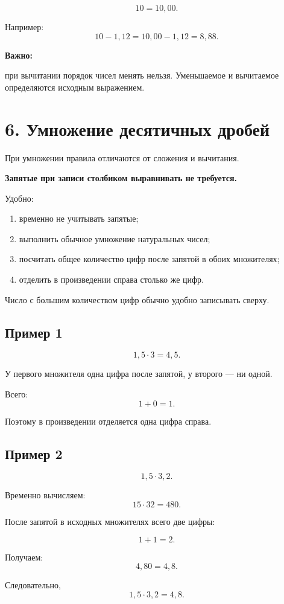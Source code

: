 \documentclass[a4paper,12pt]{article}
\newcommand{\sectiontitle}[1]{%
  \section*{\color{darkaccent}#1}%
}
\newcommand{\important}[1]{%
  \textbf{\color{darkaccent}#1}%
}
\begin{document}
\[
10=10{,}00.
\]

Например:
\[
10-1{,}12
=
10{,}00-1{,}12
=
8{,}88.
\]

\important{Важно:}
при вычитании порядок чисел менять нельзя.
Уменьшаемое и вычитаемое определяются исходным выражением.


\sectiontitle{6. Умножение десятичных дробей}

При умножении правила отличаются от сложения и вычитания.

\important{Запятые при записи столбиком выравнивать не требуется.}

Удобно:

\begin{enumerate}
  \item временно не учитывать запятые;
  \item выполнить обычное умножение натуральных чисел;
  \item посчитать общее количество цифр после запятой
        в обоих множителях;
  \item отделить в произведении справа столько же цифр.
\end{enumerate}

Число с большим количеством цифр обычно удобно записывать сверху.

\subsection*{\color{accent}Пример 1}

\[
1{,}5\cdot3=4{,}5.
\]

У первого множителя одна цифра после запятой,
у второго --- ни одной.

Всего:
\[
1+0=1.
\]

Поэтому в произведении отделяется одна цифра справа.

\subsection*{\color{accent}Пример 2}

\[
1{,}5\cdot3{,}2.
\]

Временно вычисляем:
\[
15\cdot32=480.
\]

После запятой в исходных множителях всего две цифры:

\[
1+1=2.
\]

Получаем:
\[
4{,}80=4{,}8.
\]

Следовательно,
\[
\boxed{1{,}5\cdot3{,}2=4{,}8}.
\]
\end{document}
